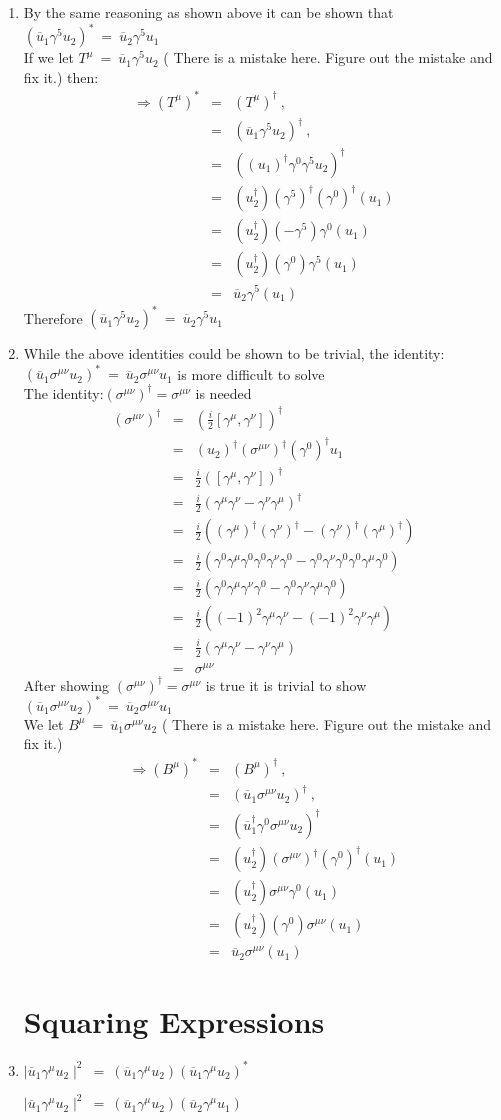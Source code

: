 \documentclass[12pt]{article}
\def \bea{\begin{eqnarray}}
\def \eea{\end{eqnarray}}
\def \nn{\nonumber}
\def \nl{\nn \\}
\def \ou{\overline{u}}
\def \ga{\gamma}
\def \si{\sigma}
\begin{document}
\begin{enumerate}
\item By the same reasoning as shown above it can be shown that $(\ou_1 \ga^5 u_2)^* ~=~ \ou_2 \ga^5 u_1$ \nl
If we let $T^\mu ~=~ \ou_1\ga^5 u_2$ ({\color{red} There is a mistake here. Figure out the mistake and fix it.}) then: 
\bea
\Rightarrow (T^\mu)^* &=& (T^\mu)^\dag ~,~~ \nl
&=& (\ou_1\ga^5 u_2)^\dag ~,~~ \nl
&=& ((u_1)^\dag\ga^0\ga^5 u_2)^\dag \nl
&=& (u_2^\dag)(\ga^5)^\dag (\ga^0)^\dag(u_1)\nl
&=& (u_2^\dag)(-\ga^5) \ga^0(u_1)\nl
&=& (u_2^\dag)(\ga^0)\ga^5(u_1)\nl
&=& \ou_2\ga^5(u_1) \nonumber
\eea \nonumber
Therefore  $(\ou_1 \ga^5 u_2)^* ~=~ \ou_2 \ga^5 u_1$

\item While the above identities could be shown to be trivial, the identity: $(\ou_1 \si^{\mu\nu} u_2)^* ~=~\ou_2 \si^{\mu\nu} u_1$ is more difficult to solve \nl
The identity:$(\si^{\mu\nu})^\dag =\si^{\mu\nu}$ is needed
\bea \nonumber
(\si^{\mu\nu})^\dag &=& (\frac{i}{2}[\ga^\mu,\ga^\nu])^\dag \nl
&=&(u_2)^\dag (\si^{\mu\nu})^\dag (\ga^0)^\dag u_1 \nl
&=& \frac{i}{2}([\ga^\mu,\ga^\nu])^\dag\nl
&=& \frac{i}{2}(\ga^\mu\ga^\nu-\ga^\nu\ga^\mu)^\dag \nl
&=& \frac{i}{2}((\ga^\mu)^\dag(\ga^\nu)^\dag-(\ga^\nu)^\dag(\ga^\mu)^\dag) \nl
&=& \frac{i}{2}(\ga^0\ga^\mu\ga^0\ga^0\ga^\nu\ga^0-\ga^0\ga^\nu\ga^0\ga^0\ga^\mu\ga^0)\nl
&=& \frac{i}{2}(\ga^0\ga^\mu\ga^\nu\ga^0-\ga^0\ga^\nu \ga^\mu\ga^0)\nl
&=& \frac{i}{2}((-1)^2\ga^\mu\ga^\nu-(-1)^2\ga^\nu \ga^\mu) \nl
&=& \frac{i}{2}(\ga^\mu\ga^\nu-\ga^\nu \ga^\mu)\nl
&=& \si^{\mu\nu}
\eea \nonumber
After showing $(\si^{\mu\nu})^\dag =\si^{\mu\nu}$ is true it is trivial to show $(\ou_1 \si^{\mu\nu} u_2)^* ~=~\ou_2 \si^{\mu\nu} u_1$ \nl
We let $B^\mu ~=~ \ou_1 \si^{\mu\nu} u_2$ ({\color{red} There is a mistake here. Figure out the mistake and fix it.})
\bea
\Rightarrow (B^\mu)^* &=& (B^\mu)^\dag ~,~~ \nl
&=& (\ou_1 \si^{\mu\nu} u_2)^\dag ~,~~ \nl
&=& (\ou_1^\dag \ga^0 \si^{\mu\nu} u_2)^\dag \nl
&=& (u_2^\dag)(\si^{\mu\nu})^\dag (\ga^0)^\dag(u_1)\nl
&=& (u_2^\dag)\si^{\mu\nu}\ga^0(u_1)\nl
&=& (u_2^\dag)(\ga^0)\si^{\mu\nu}(u_1)\nl
&=& \ou_2 \si^{\mu\nu}(u_1) \nonumber
\eea \nonumber


\section{Squaring Expressions}
\item $\mid \ou_1 \ga^\mu u_2 \mid^2 ~=~ (\ou_1 \ga^\mu u_2)(\ou_1 \ga^\mu u_2 )^*$

$\mid \ou_1 \ga^\mu u_2 \mid^2 ~=~ (\ou_1 \ga^\mu u_2)(\ou_2 \ga^\mu u_1)$


\end{enumerate}
\end{document}

